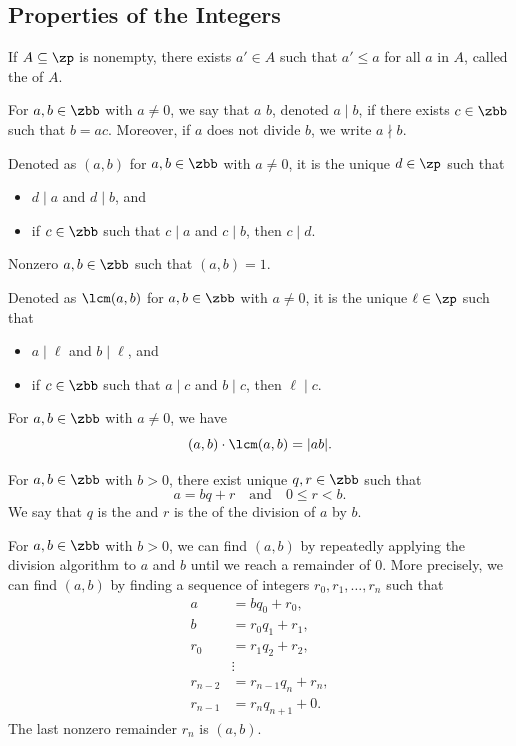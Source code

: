 \subsection{Properties of the Integers}

 If $A \subseteq \zp$ is nonempty, there exists $a' \in A$ such that $a' \leq a$ for all $a$ in $A$, called the  of $A$.

 For $a, b \in \zbb$ with $a \neq 0$, we say that $a$  $b$, denoted $a \mid b$, if there exists $c \in \zbb$ such that $b = ac$.
Moreover, if $a$ does not divide $b$, we write $a \nmid b$.

 Denoted as $(a, b)$ for $a, b \in \zbb$ with $a \neq 0$, it is the unique $d \in \zp$ such that
\begin{itemize}
    \item $d \mid a$ and $d \mid b$, and
    \item if $c \in \zbb$ such that $c \mid a$ and $c \mid b$, then $c \mid d$.
\end{itemize}

 Nonzero $a, b \in \zbb$ such that $(a, b) = 1$.

 Denoted as $\lcm(a, b)$ for $a, b \in \zbb$ with $a \neq 0$, it is the unique $\ell \in \zp$ such that
\begin{itemize}
    \item $a \mid \ell$ and $b \mid \ell$, and
    \item if $c \in \zbb$ such that $a \mid c$ and $b \mid c$, then $\ell \mid c$.
\end{itemize}

\begin{note}
    For $a, b \in \zbb$ with $a \neq 0$, we have
    \[
        (a, b) \cdot \lcm(a, b) = |ab|.
    \]
\end{note}

 For $a, b \in \zbb$ with $b > 0$, there exist unique $q, r \in \zbb$ such that
\[
    a = bq + r \quad \text{and} \quad 0 \leq r < b.
\]
We say that $q$ is the  and $r$ is the  of the division of $a$ by $b$.

 For $a, b \in \zbb$ with $b > 0$, we can find $(a, b)$ by repeatedly applying the division algorithm to $a$ and $b$ until we reach a remainder of $0$.
More precisely, we can find $(a, b)$ by finding a sequence of integers $r_0, r_1, \ldots, r_n$ such that
\begin{align*}
    a &= bq_0 + r_0, \\
    b &= r_0q_1 + r_1, \\
    r_0 &= r_1q_2 + r_2, \\
    &\vdots \\
    r_{n-2} &= r_{n-1}q_n + r_n, \\
    r_{n-1} &= r_nq_{n+1} + 0.
\end{align*}
The last nonzero remainder $r_n$ is $(a, b)$.

